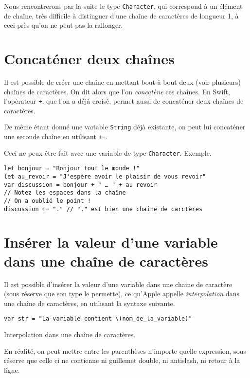 Nous rencontrerons par la suite le type \texttt{Character}, qui correspond à un élément de chaîne, très difficile à distinguer d'une chaîne de caractères de longueur 1, à ceci près qu'on ne peut pas la rallonger.
\section{Concaténer deux chaînes}
Il est possible de créer une chaîne en mettant bout à bout deux (voir plusieurs) chaînes de caractères. On dit alors que l'on \emph{concatène} ces chaînes. En Swift, l'opérateur \verb"+", que l'on a déjà croisé, permet aussi de concaténer deux chaînes de caractères.

De même étant donné une variable \texttt{String} déjà existante, on peut lui concaténer une seconde chaîne en utilisant \verb"+=".

Ceci ne peux être fait avec une variable de type \texttt{Character}. Exemple.

\begin{listing}[h]
\begin{verbatim}
let bonjour = "Bonjour tout le monde !"
let au_revoir = "J'espère avoir le plaisir de vous revoir"
var discussion = bonjour + " … " + au_revoir
// Notez les espaces dans la chaîne
// On a oublié le point !
discussion += "." // "." est bien une chaine de carctères
\end{verbatim}
\end{listing}
\section{Insérer la valeur d'une variable dans une chaîne de caractères}
Il est possible d'insérer la valeur d'une variable dans une chaine de caractère (sous réserve que son type le permette), ce qu'Apple appelle \emph{interpolation} dans une chaîne de caractères, en utilisant la syntaxe suivante.
\begin{listing}[h]
\begin{verbatim}
var str = "La variable contient \(nom_de_la_variable)"
\end{verbatim}
\caption{Interpolation dans une chaîne de caractères.}
\end{listing}%

En réalité, on peut mettre entre les parenthèses n'importe quelle expression, sous réserve que celle ci ne contienne ni guillemet double, ni antislash, ni retour à la ligne.

